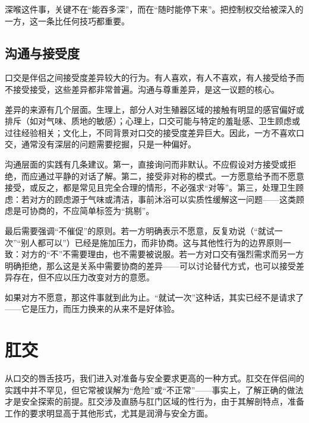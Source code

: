 \documentclass[12pt,UTF8]{ctexbook}
\begin{document}
\begin{tcolorbox}[colback=pink!5!white,colframe=red!50!black,title=贴心小叮咛]
深喉这件事，关键不在“能吞多深”，而在“随时能停下来”。把控制权交给被深入的一方，这一条比任何技巧都重要。
\end{tcolorbox}

\section{沟通与接受度}

口交是伴侣之间接受度差异较大的行为。有人喜欢，有人不喜欢，有人接受给予而不接受接受，这些差异都非常普遍。沟通与尊重差异，是这一议题的核心。

差异的来源有几个层面。生理上，部分人对生殖器区域的接触有明显的感官偏好或排斥（如对气味、质地的敏感）；心理上，口交可能与特定的羞耻感、卫生顾虑或过往经验相关；文化上，不同背景对口交的接受度差异巨大。因此，一方不喜欢口交，通常没有深层的问题需要挖掘，只是一种偏好。

沟通层面的实践有几条建议。第一，直接询问而非默认。不应假设对方接受或拒绝，而应通过平静的对话了解。第二，接受非对称的模式。一方愿意给予而不愿意接受，或反之，都是常见且完全合理的情形，不必强求“对等”。第三，处理卫生顾虑：若对方的顾虑源于气味或清洁，事前沐浴可以实质性缓解这一问题——这类顾虑是可协商的，不应简单标签为“挑剔”。

最后需要强调“不催促”的原则。若一方明确表示不愿意，反复劝说（“就试一次”“别人都可以”）已经是施加压力，而非协商。这与其他性行为的边界原则一致：对方的“不”不需要理由，也不需要被说服。若一方对口交有强烈需求而另一方明确拒绝，那么这是关系中需要协商的差异——可以讨论替代方式，也可以接受差异存在，但不应以压力改变对方的意愿。

\begin{tcolorbox}[colback=pink!5!white,colframe=red!50!black,title=贴心小叮咛]
如果对方不愿意，那这件事就到此为止。“就试一次”这种话，其实已经不是请求了——它是压力，而压力换来的从来不是好体验。
\end{tcolorbox}

\chapter{肛交}

从口交的唇舌技巧，我们进入对准备与安全要求更高的一种方式。肛交在伴侣间的实践中并不罕见，但它常被误解为“危险”或“不正常”——事实上，了解正确的做法才是安全探索的前提。肛交涉及直肠与肛门区域的性行为，由于其解剖特点，准备工作的要求明显高于其他形式，尤其是润滑与安全方面。
\end{document}
